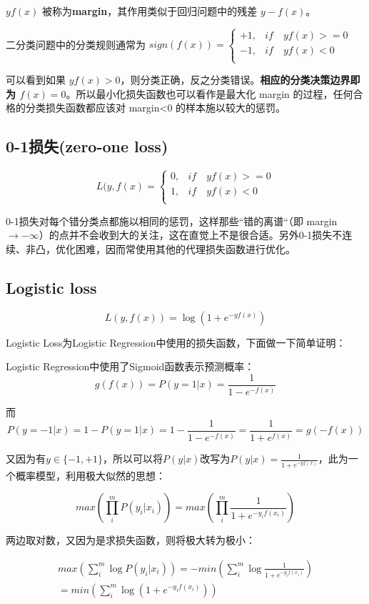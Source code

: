\documentclass[12pt]{article}
\begin{document}
$yf(x)$ 被称为\textbf{margin}，其作用类似于回归问题中的残差 $y-f(x)$。

二分类问题中的分类规则通常为
$sign(f(x)) = \begin{cases}
+1, & if \quad yf(x) >= 0 \\
-1, & if \quad  yf(x) < 0 \\
\end{cases}$

可以看到如果 $yf(x) > 0$，则分类正确，反之分类错误。\textbf{相应的分类决策边界即为 $f(x) = 0$}。所以最小化损失函数也可以看作是最大化 margin 的过程，任何合格的分类损失函数都应该对 margin<0 的样本施以较大的惩罚。

\subsection{0-1损失(zero-one loss)}
$$L(y,f(x) = \begin{cases}
0, & if \quad yf(x) >= 0 \\
1, & if \quad  yf(x) < 0 \\
\end{cases}$$

0-1损失对每个错分类点都施以相同的惩罚，这样那些“错的离谱“（即 margin $\rightarrow -\infty$）的点并不会收到大的关注，这在直觉上不是很合适。另外0-1损失不连续、非凸，优化困难，因而常使用其他的代理损失函数进行优化。

\subsection{Logistic loss}
$$L(y,f(x)) = \log(1+e^{-yf(x)})$$

Logistic Loss为Logistic Regression中使用的损失函数，下面做一下简单证明：

Logistic Regression中使用了Sigmoid函数表示预测概率：
$$g(f(x)) = P(y=1|x) = \frac{1}{1-e^{-f(x)}}$$

而
$$P(y=-1|x)=1-P(y=1|x)=1-\frac{1}{1-e^{-f(x)}}=\frac{1}{1+e^{f(x)}}=g(-f(x))$$

又因为有$y\in\{-1,+1\}$，所以可以将$P(y|x)$改写为$P(y|x)=\frac{1}{1+e^{-yf(x)}}$，此为一个概率模型，利用极大似然的思想：

$$max(\prod_i^m{P(y_i|x_i)}) = max(\prod_i^m\frac{1}{1+e^{-y_if(x_i)}})$$

两边取对数，又因为是求损失函数，则将极大转为极小：

\begin{equation}
\begin{split}
    max(\sum_i^m\log{P(y_i|x_i)}) = -min(\sum_i^m\log{\frac{1}{1+e^{-y_if(x_i)}}}) \\
=min(\sum_i^m\log({1+e^{-y_if(x_i)}}))  
\end{split}
\end{equation}
\end{document}
